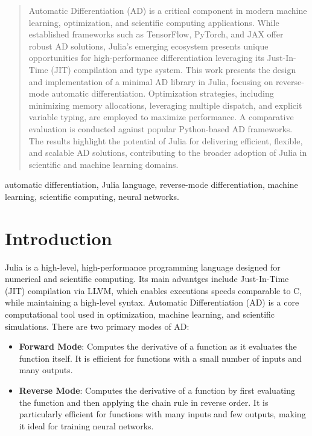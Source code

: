 \documentclass[conference]{IEEEtran}
\begin{document}
\begin{abstract}
Automatic Differentiation (AD) is a critical component in modern machine learning, 
optimization, and scientific computing applications. 
While established frameworks such as TensorFlow, PyTorch, 
and JAX offer robust AD solutions, Julia's emerging ecosystem presents unique opportunities 
for high-performance differentiation leveraging its Just-In-Time (JIT) compilation and 
type system. This work presents the design and implementation of a minimal AD library 
in Julia, focusing on reverse-mode automatic differentiation. 
Optimization strategies, including minimizing memory allocations, 
leveraging multiple dispatch, and explicit variable typing, are employed to 
maximize performance. A comparative evaluation is conducted against popular 
Python-based AD frameworks. The results highlight the potential of Julia for 
delivering efficient, flexible, and scalable AD solutions, contributing to the 
broader adoption of Julia in scientific and machine learning domains.
\end{abstract}

\begin{IEEEkeywords}
automatic differentiation, Julia language, reverse-mode differentiation, machine learning, 
scientific computing, neural networks.
\end{IEEEkeywords}

\section{Introduction}
Julia is a high-level, high-performance programming language designed for numerical 
and scientific computing. Its main advantges include Just-In-Time (JIT) compilation via LLVM, 
which enables executions speeds comparable to C, while maintaining a high-level syntax. 
Automatic Differentiation (AD) is a core computational tool used in optimization, 
machine learning, and scientific simulations. There are two primary modes of AD:

\begin{itemize}
    \item \textbf{Forward Mode}: Computes the derivative of a function as it evaluates the function itself. 
    It is efficient for functions with a small number of inputs and many outputs.
    \item \textbf{Reverse Mode}: Computes the derivative of a function by first evaluating the function and then 
    applying the chain rule in reverse order. It is particularly efficient for functions with many inputs and few outputs, 
    making it ideal for training neural networks.
\end{itemize}
\end{document}
